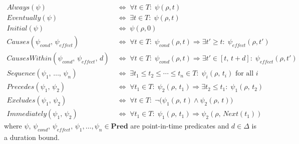 \begin{definition}\label{def:temporal_constructs}
    \begin{align*}
        \mathit{Always}(\psi) \;                                                      & \Leftrightarrow\; \forall t \in T:\; \psi(\rho, t) \\
        \mathit{Eventually}(\psi) \;                                                  & \Leftrightarrow\; \exists t \in T:\; \psi(\rho, t) \\
        \mathit{Initial}(\psi) \;                                                     & \Leftrightarrow\; \psi(\rho, 0)                    \\
        \mathit{Causes}(\psi_{\mathit{cond}},\, \psi_{\mathit{effect}}) \;            & \Leftrightarrow\;
        \forall t \in T:\; \psi_{\mathit{cond}}(\rho, t) \Rightarrow \exists t' \geq t:\; \psi_{\mathit{effect}}(\rho, t')                 \\
        \mathit{CausesWithin}(\psi_{\mathit{cond}},\, \psi_{\mathit{effect}},\, d) \; & \Leftrightarrow\;
        \forall t \in T:\; \psi_{\mathit{cond}}(\rho, t) \Rightarrow \exists t' \in [t,\, t+d]:\; \psi_{\mathit{effect}}(\rho, t')         \\
        \mathit{Sequence}(\psi_1,\, \ldots,\, \psi_n) \;                              & \Leftrightarrow\;
        \exists t_1 \leq t_2 \leq \cdots \leq t_n \in T:\; \psi_i(\rho,\, t_i) \text{ for all } i                                          \\
        \mathit{Precedes}(\psi_1,\, \psi_2) \;                                        & \Leftrightarrow\;
        \forall t_1 \in T:\; \psi_2(\rho,\, t_1) \Rightarrow \exists t_2 \leq t_1:\; \psi_1(\rho,\, t_2)                                   \\
        \mathit{Excludes}(\psi_1,\, \psi_2) \;                                        & \Leftrightarrow\;
        \forall t \in T:\; \lnot\bigl(\psi_1(\rho,\, t) \land \psi_2(\rho,\, t)\bigr)                                                      \\
        \mathit{Immediately}(\psi_1,\, \psi_2) \;                                     & \Leftrightarrow\;
        \forall t_1 \in T:\; \psi_1(\rho,\, t_1) \Rightarrow \psi_2(\rho,\, \mathit{Next}(t_1))
    \end{align*}
    where $\psi,\, \psi_{\mathit{cond}},\, \psi_{\mathit{effect}},\, \psi_1, \ldots, \psi_n \in \mathbf{Pred}$ are point-in-time predicates and $d \in \Delta$ is a duration bound.
\end{definition}

